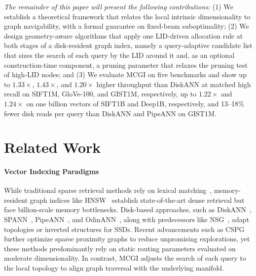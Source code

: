 \documentclass{article}
\theoremstyle{plain}
\theoremstyle{definition}
\theoremstyle{remark}
\begin{document}
\emph{The remainder of this paper will present the following contributions:} (1) We establish a theoretical framework that relates the local intrinsic dimensionality to graph navigability, with a formal guarantee on fixed-beam suboptimality; (2) We design geometry-aware algorithms that apply one LID-driven allocation rule at both stages of a disk-resident graph index, namely a query-adaptive candidate list that sizes the search of each query by the LID around it and, as an optional construction-time component, a pruning parameter that relaxes the pruning test of high-LID nodes; and (3) We evaluate MCGI on five benchmarks and show up to $1.33\times$, $1.43\times$, and $1.20\times$ higher throughput than DiskANN at matched high recall on SIFT1M, GloVe-100, and GIST1M, respectively, up to $1.22\times$ and $1.24\times$ on one billion vectors of SIFT1B and Deep1B, respectively, and 13--18\% fewer disk reads per query than DiskANN and PipeANN on GIST1M.

\section{Related Work}
\label{sec:related_work}

\paragraph{Vector Indexing Paradigms}
While traditional sparse retrieval methods rely on lexical matching~\cite{robertson2009probabilistic}, memory-resident graph indices like HNSW~\cite{malkov2018efficient} establish state-of-the-art dense retrieval but face billion-scale memory bottlenecks. Disk-based approaches, such as DiskANN~\cite{subramanya2019diskann}, SPANN~\cite{chen2021spann}, PipeANN~\cite{osdi25pipeann}, and OdinANN~\cite{fast26odinann}, along with predecessors like NSG~\cite{fu2019nsg}, adapt topologies or inverted structures for SSDs. Recent advancements such as CSPG~\cite{NEURIPS2024_bab1486c} further optimize sparse proximity graphs  to reduce unpromising explorations, yet these methods predominantly rely on static routing parameters evaluated on moderate dimensionality. In contrast, MCGI adjusts the search of each query to the local topology to align graph traversal with the underlying manifold.
\end{document}
